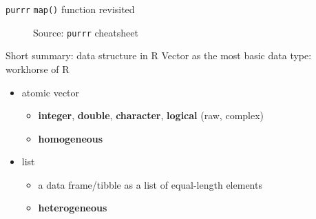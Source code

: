 \documentclass[
  ignorenonframetext,
]{beamer}
\providecommand{\tightlist}{%
  \setlength{\itemsep}{0pt}\setlength{\parskip}{0pt}}\usepackage{longtable,booktabs,array}
\begin{document}
\begin{frame}[fragile]{\texttt{purrr} \texttt{map()} function revisited}
\protect\hypertarget{purrr-map-function-revisited}{}
\begin{figure}

\begin{minipage}[t]{0.50\linewidth}

{\centering 


}

\end{minipage}%
%
\begin{minipage}[t]{0.50\linewidth}

{\centering 


\caption{Source: \texttt{purrr} cheatsheet}

}

\end{minipage}%

\end{figure}
\end{frame}

\begin{frame}{Short summary: data structure in R}
\protect\hypertarget{short-summary-data-structure-in-r}{}
Vector as the most basic data type: workhorse of R

\begin{itemize}
\tightlist
\item
  atomic vector

  \begin{itemize}
  \tightlist
  \item
    \textbf{integer}, \textbf{double}, \textbf{character},
    \textbf{logical} (raw, complex)
  \item
    \textbf{homogeneous}
  \end{itemize}
\item
  list

  \begin{itemize}
  \tightlist
  \item
    a data frame/tibble as a list of equal-length elements
  \item
    \textbf{heterogeneous}
  \end{itemize}
\end{itemize}
\end{frame}
\end{document}
